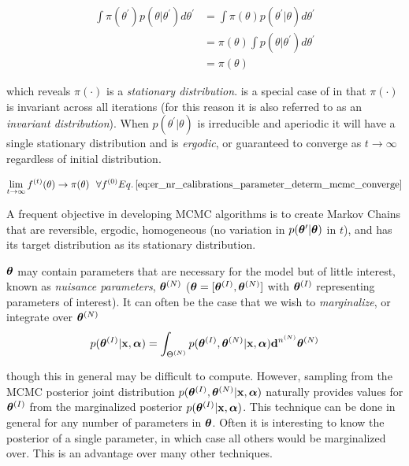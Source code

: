 \begin{equation}
\begin{aligned}
\int \pi (\theta^{\prime}) p(\theta|\theta^{\prime}) d\theta^{\prime} &=
\int \pi (\theta) p(\theta^{\prime}|\theta) d\theta^{\prime} \\
&= \pi (\theta) \int p(\theta|\theta^{\prime}) d\theta^{\prime} \\
&= \pi (\theta)
\end{aligned}
\label{eq:er_nr_calibrations_parameter_determ_mcmc_stationary}
\end{equation}

\noindent which reveals $\pi (\cdot)$ is a
\textit{stationary distribution}.   is a special case of
 in that $\pi( \cdot )$ is invariant across all iterations (for this reason
it is also referred to as an \textit{invariant distribution}).  When $p(\theta^{\prime}|\theta)$ is irreducible and
aperiodic it will have a single stationary distribution and is \textit{ergodic}, or guaranteed to converge as
$t \rightarrow \infty$ regardless of initial distribution.

\begin{equation}
\lim_{t \rightarrow \infty} f^{(t)}(\theta) \rightarrow \pi (\theta)\ \ \forall f^{(0)}
\eqnref{eq:er_nr_calibrations_parameter_determ_mcmc_converge}
\end{equation}

A frequent objective in developing MCMC algorithms is to create Markov Chains that are reversible, ergodic, homogeneous
(no variation in $p(\boldsymbol{\theta}^{\prime}|\boldsymbol{\theta})$ in $t$), and has its target distribution as its stationary distribution.

$\boldsymbol{\theta}$ may contain parameters that are necessary for the model but of little interest,
known as \textit{nuisance parameters}, $\boldsymbol{\theta}^{(N)}$ ($\boldsymbol{\theta} = [\boldsymbol{\theta}^{(I)}, \boldsymbol{\theta}^{(N)}]$ with
$\boldsymbol{\theta}^{(I)}$ representing parameters of interest).  It can often be the case that we wish to \textit{marginalize}, or integrate
over $\boldsymbol{\theta}^{(N)}$
\begin{equation}
p(\boldsymbol{\theta}^{(I)}|\mathbf{x}, \boldsymbol{\alpha}) = \int_{\Theta^{(N)}}
p(\boldsymbol{\theta}^{(I)}, \boldsymbol{\theta}^{(N)}|\mathbf{x}, \boldsymbol{\alpha}) \mathbf{d}^{n^{(N)}}\boldsymbol{\theta}^{(N)}
\end{equation}

\noindent though this in general may be difficult to compute.  However, sampling from the MCMC posterior joint distribution
$p(\boldsymbol{\theta}^{(I)}, \boldsymbol{\theta}^{(N)}|\mathbf{x}, \boldsymbol{\alpha})$ naturally provides values for $\boldsymbol{\theta}^{(I)}$ from the
marginalized posterior $p(\boldsymbol{\theta}^{(I)}|\mathbf{x}, \boldsymbol{\alpha})$.  This technique can be done in general for any number of
parameters in $\boldsymbol{\theta}$.  Often it is interesting to know the posterior of a single parameter, in which case all others would
be marginalized over.  This is an advantage over many other techniques.

